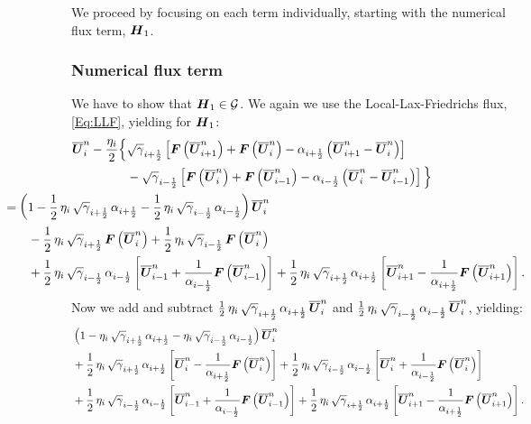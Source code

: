 \documentclass[10pt,preprint]{aastex}
\begin{document}
We proceed by focusing on each term individually, starting with the numerical flux term, $\boldsymbol{H}_{1}$.

\subsubsection{Numerical flux term}
We have to show that $\boldsymbol{H}_{1}\in\mathcal{G}$. We again we use the Local-Lax-Friedrichs flux, \eqref{Eq:LLF}, yielding for $\boldsymbol{H}_{1}$:
\begin{align}
    \ol{\bU}^{n}_{i}-\f{\eta_{i}}{2}\Big\{&\sqrtgm_{\iph}\left[\bF\left(\ol{\bU}^{n}_{i+1}\right)+\bF\left(\ol{\bU}^{n}_{i}\right)-\alpha_{\iph}\left(\ol{\bU}^{n}_{i+1}-\ol{\bU}^{n}_{i}\right)\right]\\
    &-\sqrtgm_{\imh}\left[\bF\left(\ol{\bU}^{n}_{i}\right)+\bF\left(\ol{\bU}^{n}_{i-1}\right)-\alpha_{\imh}\left(\ol{\bU}^{n}_{i}-\ol{\bU}^{n}_{i-1}\right)\right]\Big\}\\
    &\hspace{-10em}=\left(1-\f{1}{2}\,\eta_{i}\,\sqrtgm_{\iph}\,\alpha_{\iph}-\f{1}{2}\,\eta_{i}\,\sqrtgm_{\imh}\,\alpha_{\imh}\right)\ol{\bU}^{n}_{i}\\
    &\hspace{-8em}-\f{1}{2}\,\eta_{i}\,\sqrtgm_{\iph}\,\bF\left(\ol{\bU}^{n}_{i}\right)+\f{1}{2}\,\eta_{i}\,\sqrtgm_{\imh}\,\bF\left(\ol{\bU}^{n}_{i}\right)\\
    &\hspace{-8em}+\f{1}{2}\,\eta_{i}\,\sqrtgm_{\imh}\,\alpha_{\imh}\left[\ol{\bU}^{n}_{i-1}+\f{1}{\alpha_{\imh}}\bF\left(\ol{\bU}^{n}_{i-1}\right)\right]+\f{1}{2}\,\eta_{i}\,\sqrtgm_{\iph}\,\alpha_{\iph}\left[\ol{\bU}^{n}_{i+1}-\f{1}{\alpha_{\iph}}\bF\left(\ol{\bU}^{n}_{i+1}\right)\right].
\end{align}
Now we add and subtract $\frac{1}{2}\,\eta_{i}\,\sqrt{\gamma}_{i+\frac{1}{2}}\,\alpha_{i+\frac{1}{2}}\,\overline{\boldsymbol{U}}^{n}_{i}$ and $\frac{1}{2}\,\eta_{i}\,\sqrt{\gamma}_{i-\frac{1}{2}}\,\alpha_{i-\frac{1}{2}}\,\overline{\boldsymbol{U}}^{n}_{i}$, yielding:
\begin{align}
    &\left(1-\eta_{i}\,\sqrt{\gamma}_{i+\frac{1}{2}}\,\alpha_{i+\frac{1}{2}}-\eta_{i}\,\sqrt{\gamma}_{i-\frac{1}{2}}\,\alpha_{i-\frac{1}{2}}\right)\overline{\boldsymbol{U}}^{n}_{i}\\
    &+\frac{1}{2}\,\eta_{i}\,\sqrt{\gamma}_{i+\frac{1}{2}}\,\alpha_{i+\frac{1}{2}}\left[\overline{\boldsymbol{U}}^{n}_{i}-\frac{1}{\alpha_{i+\frac{1}{2}}}\boldsymbol{F}\left(\overline{\boldsymbol{U}}^{n}_{i}\right)\right]+\frac{1}{2}\,\eta_{i}\,\sqrt{\gamma}_{i-\frac{1}{2}}\,\alpha_{i-\frac{1}{2}}\left[\overline{\boldsymbol{U}}^{n}_{i}+\frac{1}{\alpha_{i-\frac{1}{2}}}\boldsymbol{F}\left(\overline{\boldsymbol{U}}^{n}_{i}\right)\right]\\
    &+\frac{1}{2}\,\eta_{i}\,\sqrt{\gamma}_{i-\frac{1}{2}}\,\alpha_{i-\frac{1}{2}}\left[\overline{\boldsymbol{U}}^{n}_{i-1}+\frac{1}{\alpha_{i-\frac{1}{2}}}\boldsymbol{F}\left(\overline{\boldsymbol{U}}^{n}_{i-1}\right)\right]+\frac{1}{2}\,\eta_{i}\,\sqrt{\gamma}_{i+\frac{1}{2}}\,\alpha_{i+\frac{1}{2}}\left[\overline{\boldsymbol{U}}^{n}_{i+1}-\frac{1}{\alpha_{i+\frac{1}{2}}}\boldsymbol{F}\left(\overline{\boldsymbol{U}}^{n}_{i+1}\right)\right].
\end{align}
\end{document}
